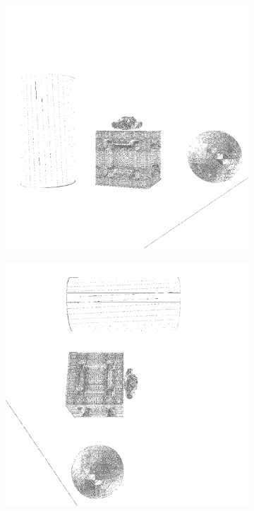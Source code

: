 \begin{figure}[tb]
    \begin{subfigure}[t]{0.32\textwidth}
        \includegraphics[width=\linewidth]{chapter04/img/mean-0001.png}
    \end{subfigure}
    \begin{subfigure}[t]{0.32\textwidth}
        \includegraphics[width=\linewidth]{chapter04/img/mean-0030.png}

\end{subfigure}
\end{figure}
